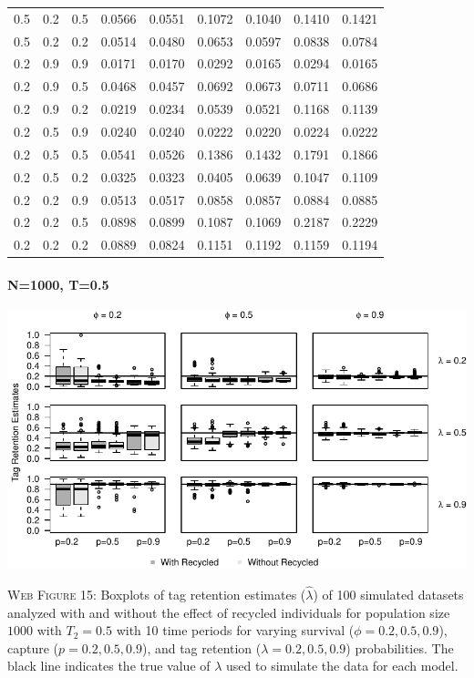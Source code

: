 \documentclass[]{article}
\let\oldparagraph\paragraph
\renewcommand{\paragraph}[1]{\oldparagraph{#1}\mbox{}}
\begin{document}
\begin{table}[ht]
{\begin{tabular}{rrrrrrrrr}
  0.5 & 0.2 & 0.5 & 0.0566 & 0.0551 & 0.1072 & 0.1040 & 0.1410 & 0.1421 \\ 
  0.5 & 0.2 & 0.2 & 0.0514 & 0.0480 & 0.0653 & 0.0597 & 0.0838 & 0.0784 \\ 
  0.2 & 0.9 & 0.9 & 0.0171 & 0.0170 & 0.0292 & 0.0165 & 0.0294 & 0.0165 \\ 
  0.2 & 0.9 & 0.5 & 0.0468 & 0.0457 & 0.0692 & 0.0673 & 0.0711 & 0.0686 \\ 
  0.2 & 0.9 & 0.2 & 0.0219 & 0.0234 & 0.0539 & 0.0521 & 0.1168 & 0.1139 \\ 
  0.2 & 0.5 & 0.9 & 0.0240 & 0.0240 & 0.0222 & 0.0220 & 0.0224 & 0.0222 \\ 
  0.2 & 0.5 & 0.5 & 0.0541 & 0.0526 & 0.1386 & 0.1432 & 0.1791 & 0.1866 \\ 
  0.2 & 0.5 & 0.2 & 0.0325 & 0.0323 & 0.0405 & 0.0639 & 0.1047 & 0.1109 \\ 
  0.2 & 0.2 & 0.9 & 0.0513 & 0.0517 & 0.0858 & 0.0857 & 0.0884 & 0.0885 \\ 
  0.2 & 0.2 & 0.5 & 0.0898 & 0.0899 & 0.1087 & 0.1069 & 0.2187 & 0.2229 \\ 
  0.2 & 0.2 & 0.2 & 0.0889 & 0.0824 & 0.1151 & 0.1192 & 0.1159 & 0.1194 \\ 
   \hline
\end{tabular}
}
\endgroup
\end{table}

\newpage

\paragraph{N=1000, T=0.5}\label{n1000-t0.5-2}

\includegraphics{Appendix_BW_files/figure-latex/figure15_tagretention_GJSTL4-1.pdf}

\textsc{Web Figure 15:} Boxplots of tag retention estimates
(\(\hat{\lambda}\)) of 100 simulated datasets analyzed with and without
the effect of recycled individuals for population size \(1000\) with
\(T_2=0.5\) with 10 time periods for varying survival
(\(\phi=0.2,0.5,0.9\)), capture (\(p=0.2,0.5,0.9\)), and tag retention
(\(\lambda=0.2,0.5,0.9\)) probabilities. The black line indicates the
true value of \(\lambda\) used to simulate the data for each model.
\end{document}
